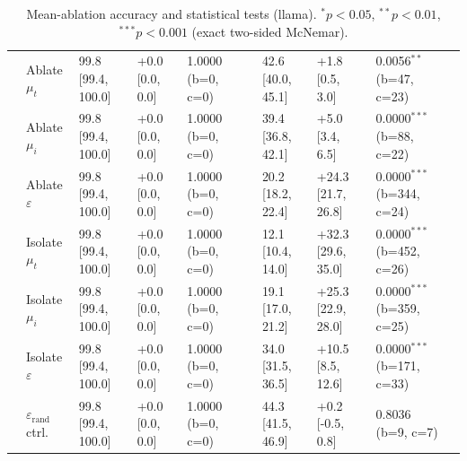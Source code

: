 \begin{table}[h!]
\begin{tabular}{ll lllc lllc}
 & Ablate $\mu_t$ & 99.8 [99.4, 100.0] & +0.0 [0.0, 0.0] & 1.0000 (b=0, c=0) &  & 42.6 [40.0, 45.1] & +1.8 [0.5, 3.0] & 0.0056$^{**}$ (b=47, c=23) &  \\
 & Ablate $\mu_i$ & 99.8 [99.4, 100.0] & +0.0 [0.0, 0.0] & 1.0000 (b=0, c=0) &  & 39.4 [36.8, 42.1] & +5.0 [3.4, 6.5] & 0.0000$^{***}$ (b=88, c=22) &  \\
 & Ablate $\varepsilon$ & 99.8 [99.4, 100.0] & +0.0 [0.0, 0.0] & 1.0000 (b=0, c=0) &  & 20.2 [18.2, 22.4] & +24.3 [21.7, 26.8] & 0.0000$^{***}$ (b=344, c=24) &  \\
 & Isolate $\mu_t$ & 99.8 [99.4, 100.0] & +0.0 [0.0, 0.0] & 1.0000 (b=0, c=0) &  & 12.1 [10.4, 14.0] & +32.3 [29.6, 35.0] & 0.0000$^{***}$ (b=452, c=26) &  \\
 & Isolate $\mu_i$ & 99.8 [99.4, 100.0] & +0.0 [0.0, 0.0] & 1.0000 (b=0, c=0) &  & 19.1 [17.0, 21.2] & +25.3 [22.9, 28.0] & 0.0000$^{***}$ (b=359, c=25) &  \\
 & Isolate $\varepsilon$ & 99.8 [99.4, 100.0] & +0.0 [0.0, 0.0] & 1.0000 (b=0, c=0) &  & 34.0 [31.5, 36.5] & +10.5 [8.5, 12.6] & 0.0000$^{***}$ (b=171, c=33) &  \\
 & $\varepsilon_\mathrm{rand}$ ctrl. & 99.8 [99.4, 100.0] & +0.0 [0.0, 0.0] & 1.0000 (b=0, c=0) &  & 44.3 [41.5, 46.9] & +0.2 [-0.5, 0.8] & 0.8036 (b=9, c=7) &  \\
\bottomrule
\end{tabular}
\caption{Mean-ablation accuracy and statistical tests (llama). $^{*}p{<}0.05$, $^{**}p{<}0.01$, $^{***}p{<}0.001$ (exact two-sided McNemar).}
\label{tab:mean_ablation_stats_llama}
\end{table}